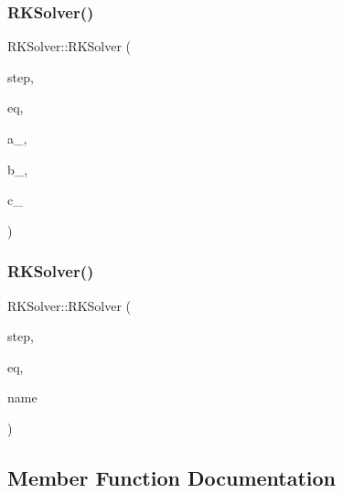 \subsubsection{\texorpdfstring{R\+K\+Solver()}{RKSolver()}\hspace{0.1cm}{\footnotesize\ttfamily [1/2]}}
{\footnotesize\ttfamily R\+K\+Solver\+::\+R\+K\+Solver (\begin{DoxyParamCaption}\item[{double}]{step,  }\item[{const \hyperlink{classBaseEquation}{Base\+Equation} \&}]{eq,  }\item[{const std\+::vector$<$ std\+::vector$<$ double $>$$>$ \&}]{a\+\_\+,  }\item[{const std\+::vector$<$ double $>$ \&}]{b\+\_\+,  }\item[{const std\+::vector$<$ double $>$ \&}]{c\+\_\+ }\end{DoxyParamCaption})}

\mbox{\label{classRKSolver_aa1b51cd0bb2327b364d3a47f131d8bf0}} 
\subsubsection{\texorpdfstring{R\+K\+Solver()}{RKSolver()}\hspace{0.1cm}{\footnotesize\ttfamily [2/2]}}
{\footnotesize\ttfamily R\+K\+Solver\+::\+R\+K\+Solver (\begin{DoxyParamCaption}\item[{double}]{step,  }\item[{const \hyperlink{classBaseEquation}{Base\+Equation} \&}]{eq,  }\item[{const std\+::string}]{name }\end{DoxyParamCaption})}



\subsection{Member Function Documentation}
\mbox{\label{classRKSolver_a0d3892f1b340e82c8aa135441f5adbed}} 
